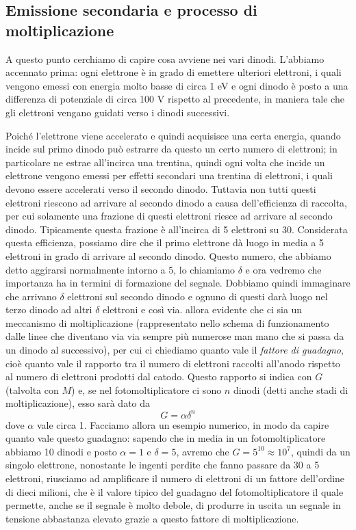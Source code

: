 \subsection{Emissione secondaria e processo di moltiplicazione}
A questo punto cerchiamo di capire cosa avviene nei vari dinodi. L'abbiamo accennato prima: ogni elettrone è in grado di emettere ulteriori elettroni, i quali vengono emessi con energia molto basse di circa 1 eV e ogni dinodo è posto a una differenza di potenziale di circa 100 V rispetto al precedente, in maniera tale che gli elettroni vengano guidati verso i dinodi successivi.

Poiché l'elettrone viene accelerato e quindi acquisisce una certa energia, quando incide sul primo dinodo può estrarre da questo un certo numero di elettroni; in particolare ne estrae all'incirca una trentina, quindi ogni volta che incide un elettrone vengono emessi per effetti secondari una trentina di elettroni, i quali devono essere accelerati verso il secondo dinodo. Tuttavia non tutti questi elettroni riescono ad arrivare al secondo dinodo a causa dell'efficienza di raccolta, per cui solamente una frazione di questi elettroni riesce ad arrivare al secondo dinodo. Tipicamente questa frazione è all'incirca di 5 elettroni su 30. Considerata questa efficienza, possiamo dire che il primo elettrone dà luogo in media a 5 elettroni in grado di arrivare al secondo dinodo. Questo numero, che abbiamo detto aggirarsi normalmente intorno a 5, lo chiamiamo $\delta$ e ora vedremo che importanza ha in termini di formazione del segnale. Dobbiamo quindi immaginare che arrivano $\delta$ elettroni sul secondo dinodo e ognuno di questi darà luogo nel terzo dinodo ad altri $\delta$ elettroni e così via. \E allora evidente che ci sia un meccanismo di moltiplicazione (rappresentato nello schema di funzionamento dalle linee che diventano via via sempre più numerose man mano che si passa da un dinodo al successivo), per cui ci chiediamo quanto vale il \textit{fattore di guadagno}, cioè quanto vale il rapporto tra il numero di elettroni raccolti all'anodo rispetto al numero di elettroni prodotti dal catodo. Questo rapporto si indica con $G$ (talvolta con $M$) e, se nel fotomoltiplicatore ci sono $n$ dinodi (detti anche stadi di moltiplicazione), esso sarà dato da
\begin{equation*}
   G=\alpha \delta^n
\end{equation*}
dove $\alpha$ vale circa 1. Facciamo allora un esempio numerico, in modo da capire quanto vale questo guadagno: sapendo che in media in un fotomoltiplicatore abbiamo 10 dinodi e posto $\alpha=1$ e $\delta=5$, avremo che $G=5^{10}\approx 10^7$, quindi da un singolo elettrone, nonostante le ingenti perdite che fanno passare da 30 a 5 elettroni, riusciamo ad amplificare il numero di elettroni di un fattore dell'ordine di dieci milioni, che è il valore tipico del guadagno del fotomoltiplicatore il quale permette, anche se il segnale è molto debole, di produrre in uscita un segnale in tensione abbastanza elevato grazie a questo fattore di moltiplicazione.

